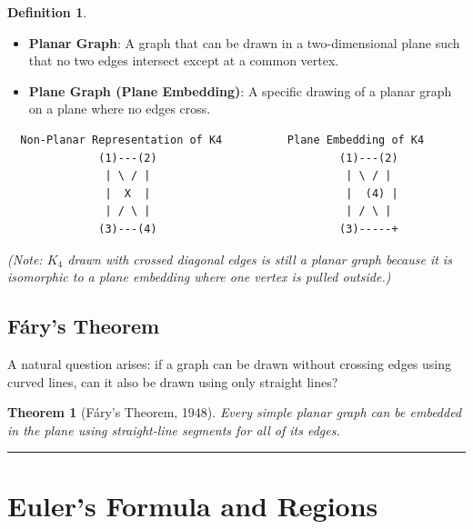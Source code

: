\documentclass[
]{book}
\newtheorem{theorem}{Theorem}[chapter]
\theoremstyle{definition}
\newtheorem{definition}{Definition}[chapter]
\theoremstyle{definition}
\theoremstyle{definition}
\theoremstyle{definition}
\theoremstyle{remark}
\begin{document}
\begin{definition}
\protect\hypertarget{def:unnamed-chunk-22}{}\label{def:unnamed-chunk-22}\leavevmode

\begin{itemize}
\item
  \textbf{Planar Graph}: A graph that can be drawn in a two-dimensional plane such that no two edges intersect except at a common vertex.
\item
  \textbf{Plane Graph (Plane Embedding)}: A specific drawing of a planar graph on a plane where no edges cross.
\end{itemize}

\end{definition}

\begin{verbatim}
  Non-Planar Representation of K4          Plane Embedding of K4
              (1)---(2)                            (1)---(2)
               | \ / |                              | \ / |
               |  X  |                              |  (4) |
               | / \ |                              | / \ |
              (3)---(4)                            (3)-----+
\end{verbatim}

\emph{(Note: \(K_4\) drawn with crossed diagonal edges is still a planar graph because it is isomorphic to a plane embedding where one vertex is pulled outside.)}

\subsection{Fáry's Theorem}\label{fuxe1rys-theorem}

A natural question arises: if a graph can be drawn without crossing edges using curved lines, can it also be drawn using only straight lines?

\begin{theorem}[Fáry's Theorem, 1948]
\protect\hypertarget{thm:unnamed-chunk-23}{}\label{thm:unnamed-chunk-23}Every simple planar graph can be embedded in the plane using straight-line segments for all of its edges.
\end{theorem}

\begin{center}\rule{0.5\linewidth}{0.5pt}\end{center}

\section{Euler's Formula and Regions}\label{eulers-formula-and-regions}
\end{document}
